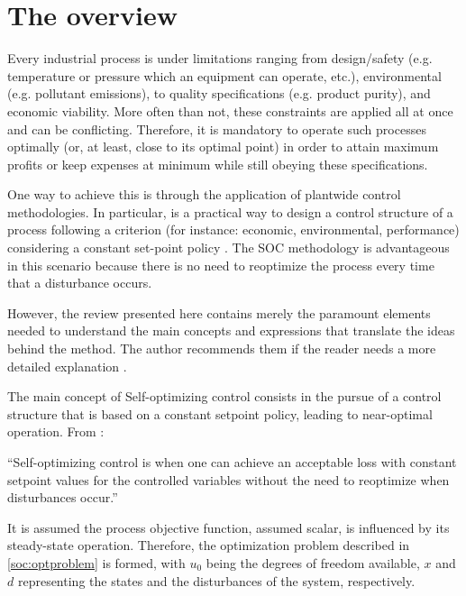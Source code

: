 \documentclass[../msc-thesis.tex]{subfiles}
\begin{document}
\chapter{The \soc overview}

Every  industrial process is under limitations ranging from design/safety (e.g. 
temperature or pressure which an equipment can operate, etc.), environmental 
(e.g. pollutant emissions), to quality specifications (e.g. product purity), 
and economic viability. More often than not, these constraints are applied all 
at once and can be conflicting. Therefore, it is mandatory to operate such 
processes optimally (or, at least, close to its optimal point) in order to 
attain maximum profits or keep expenses at minimum while still obeying these 
specifications.

One way to achieve this is through the application of plantwide control 
methodologies. In particular, \soc \cite{Morari1980,Skogestad2000,Alstad2009} 
is a practical way to design a control structure of a process following a 
criterion (for instance: economic, environmental, performance) considering a 
constant set-point policy \cite{Alves2018}. The SOC methodology is 
advantageous in this scenario because there is no need to reoptimize the 
process every time that a disturbance occurs.

However, the review presented here contains merely the paramount elements 
needed to understand the main concepts and expressions that translate the 
ideas behind the method. The author recommends them if the reader needs a 
more detailed explanation \cite{Skogestad2000,Halvorsen2003,Hori2005,Hori2007,
Alstad2009,Alves2018,Kariwala2008,Kariwala2009,Umar2012}.

The main concept of Self-optimizing control consists in the pursue of a 
control structure that is based on a constant setpoint policy, leading to 
near-optimal operation. From \textcite{Skogestad2004}:

\begin{citacao}
``Self-optimizing control is when one can achieve an acceptable loss with 
constant setpoint values for the controlled variables without the need to 
reoptimize when disturbances occur.''    
\end{citacao}

It is assumed the process objective function, assumed scalar, is influenced by 
its steady-state operation. Therefore, the optimization problem described in 
\autoref{soc:optproblem} is formed, with $u_{0}$ being the degrees of freedom 
available, $x$ and $d$ representing the states and the disturbances of the 
system, respectively.
\end{document}
